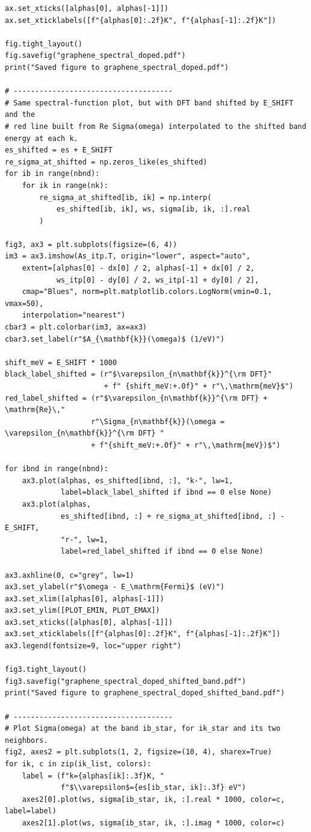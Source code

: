 \documentclass[a4paper,11pt,serif]{article}
\begin{document}
\begin{scriptsize}
\begin{Verbatim}[frame=single]
ax.set_xticks([alphas[0], alphas[-1]])
ax.set_xticklabels([f"{alphas[0]:.2f}K", f"{alphas[-1]:.2f}K"])

fig.tight_layout()
fig.savefig("graphene_spectral_doped.pdf")
print("Saved figure to graphene_spectral_doped.pdf")

# -------------------------------------
# Same spectral-function plot, but with DFT band shifted by E_SHIFT and the
# red line built from Re Sigma(omega) interpolated to the shifted band energy at each k.
es_shifted = es + E_SHIFT
re_sigma_at_shifted = np.zeros_like(es_shifted)
for ib in range(nbnd):
    for ik in range(nk):
        re_sigma_at_shifted[ib, ik] = np.interp(
            es_shifted[ib, ik], ws, sigma[ib, ik, :].real
        )

fig3, ax3 = plt.subplots(figsize=(6, 4))
im3 = ax3.imshow(As_itp.T, origin="lower", aspect="auto",
    extent=[alphas[0] - dx[0] / 2, alphas[-1] + dx[0] / 2,
            ws_itp[0] - dy[0] / 2, ws_itp[-1] + dy[0] / 2],
    cmap="Blues", norm=plt.matplotlib.colors.LogNorm(vmin=0.1, vmax=50),
    interpolation="nearest")
cbar3 = plt.colorbar(im3, ax=ax3)
cbar3.set_label(r"$A_{\mathbf{k}}(\omega)$ (1/eV)")

shift_meV = E_SHIFT * 1000
black_label_shifted = (r"$\varepsilon_{n\mathbf{k}}^{\rm DFT}"
                       + f" {shift_meV:+.0f}" + r"\,\mathrm{meV}$")
red_label_shifted = (r"$\varepsilon_{n\mathbf{k}}^{\rm DFT} + \mathrm{Re}\,"
                    r"\Sigma_{n\mathbf{k}}(\omega = \varepsilon_{n\mathbf{k}}^{\rm DFT} "
                    + f"{shift_meV:+.0f}" + r"\,\mathrm{meV})$")

for ibnd in range(nbnd):
    ax3.plot(alphas, es_shifted[ibnd, :], "k-", lw=1,
             label=black_label_shifted if ibnd == 0 else None)
    ax3.plot(alphas,
             es_shifted[ibnd, :] + re_sigma_at_shifted[ibnd, :] - E_SHIFT,
             "r-", lw=1,
             label=red_label_shifted if ibnd == 0 else None)

ax3.axhline(0, c="grey", lw=1)
ax3.set_ylabel(r"$\omega - E_\mathrm{Fermi}$ (eV)")
ax3.set_xlim([alphas[0], alphas[-1]])
ax3.set_ylim([PLOT_EMIN, PLOT_EMAX])
ax3.set_xticks([alphas[0], alphas[-1]])
ax3.set_xticklabels([f"{alphas[0]:.2f}K", f"{alphas[-1]:.2f}K"])
ax3.legend(fontsize=9, loc="upper right")

fig3.tight_layout()
fig3.savefig("graphene_spectral_doped_shifted_band.pdf")
print("Saved figure to graphene_spectral_doped_shifted_band.pdf")

# -------------------------------------
# Plot Sigma(omega) at the band ib_star, for ik_star and its two neighbors.
fig2, axes2 = plt.subplots(1, 2, figsize=(10, 4), sharex=True)
for ik, c in zip(ik_list, colors):
    label = (f"k={alphas[ik]:.3f}K, "
             f"$\\varepsilon$={es[ib_star, ik]:.3f} eV")
    axes2[0].plot(ws, sigma[ib_star, ik, :].real * 1000, color=c, label=label)
    axes2[1].plot(ws, sigma[ib_star, ik, :].imag * 1000, color=c)


\end{Verbatim}
\end{scriptsize}
\end{document}
